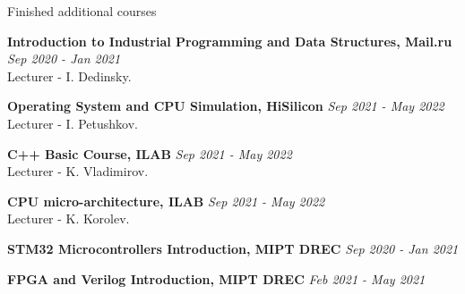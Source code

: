 \documentclass{resume} %
\begin{document}
\begin{rSection}{Finished additional courses}

{\bf Introduction to Industrial Programming and Data Structures, Mail.ru} \hfill
    {\em Sep 2020 - Jan 2021}
\\ Lecturer - I. Dedinsky.

{\bf Operating System and CPU Simulation, HiSilicon} \hfill {\em Sep 2021 - May 2022}
\\ Lecturer - I. Petushkov.

{\bf C++ Basic Course, ILAB} \hfill {\em Sep 2021 - May 2022}
\\ Lecturer - K. Vladimirov.

{\bf CPU micro-architecture, ILAB} \hfill {\em Sep 2021 - May 2022}
\\ Lecturer - K. Korolev.

{\bf STM32 Microcontrollers Introduction, MIPT DREC} \hfill {\em Sep 2020 - Jan 2021}

{\bf FPGA and Verilog Introduction, MIPT DREC} \hfill {\em Feb 2021 - May 2021}

\end{rSection}
\end{document}
